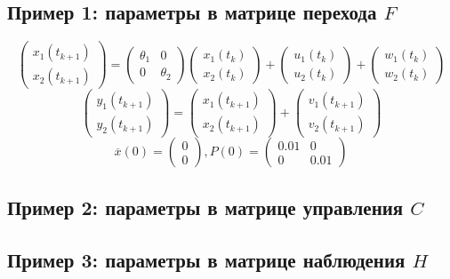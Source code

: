 \documentclass[a4paper,14pt]{extarticle}
\newcommand{\fut}[0]{t_{k+1}}
\begin{document}
\subsection{Пример 1: параметры в матрице перехода $F$}
\[
	\begin{pmatrix} x_1(\fut) \\ x_2(\fut) \end{pmatrix} =
	\begin{pmatrix} \theta_1 & 0 \\ 0 & \theta_2 \end{pmatrix}
	\begin{pmatrix} x_1(t_k) \\ x_2(t_k) \end{pmatrix}
	+ \begin{pmatrix} u_1(t_k) \\ u_2(t_k) \end{pmatrix}
	+ \begin{pmatrix} w_1(t_k) \\ w_2(t_k) \end{pmatrix}
\]
\[
	\begin{pmatrix} y_1(\fut) \\ y_2(\fut) \end{pmatrix} =
	\begin{pmatrix} x_1(\fut) \\ x_2(\fut) \end{pmatrix} +
	\begin{pmatrix} v_1(\fut) \\ v_2(\fut) \end{pmatrix}
\]
\[
	\overline{x}(0) = \begin{pmatrix} 0 \\ 0 \end{pmatrix},
	P(0) = \begin{pmatrix} 0.01 & 0 \\ 0 & 0.01 \end{pmatrix}
\]

\subsection{Пример 2: параметры в матрице управления $C$}

\subsection{Пример 3: параметры в матрице наблюдения $H$}
\end{document}
